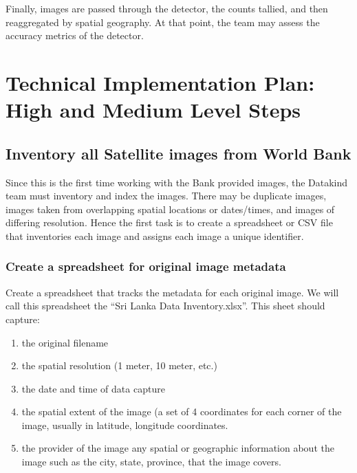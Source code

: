 \documentclass[12pt, a4paper, oneside, headinclude, footinclude]{article}
\begin{document}
Finally, images are passed through the detector, the counts tallied, and then reaggregated by spatial geography. At that point, the team may assess the accuracy metrics of the detector.


\section{Technical Implementation Plan: High and Medium Level Steps} \label{implementationplan}

\subsection{Inventory all Satellite images from World Bank}
Since this is the first time working with the Bank provided images, the Datakind team must inventory and index the images. There may be duplicate images, images taken from overlapping spatial locations or dates/times, and images of differing resolution. Hence the first task is to create a spreadsheet or CSV file that inventories each image and assigns each image a unique identifier.

\subsubsection{Create a spreadsheet for original image metadata}

Create a spreadsheet that tracks the metadata for each original image. We will call this spreadsheet the “Sri Lanka Data Inventory.xlsx”. This sheet should capture:

\begin{enumerate}
  \item the original filename
  \item the spatial resolution (1 meter, 10 meter, etc.)
  \item the date and time of data capture
  \item the spatial extent of the image (a set of 4 coordinates for each corner
    of the image, usually in latitude, longitude coordinates.
  \item the provider of the image any spatial or geographic information about
    the image such as the city, state, province, that the image covers.
\end{enumerate}
\end{document}
